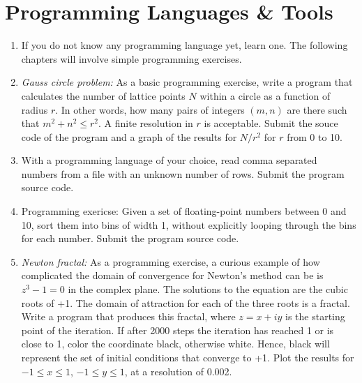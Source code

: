 \documentclass{article}
\begin{document}
\newpage
\section{Programming Languages \& Tools}

\begin{enumerate}

\item If you do not know any programming language yet, learn one. The following chapters will involve simple programming exercises. 

  
\item {\it Gauss circle problem:}
  As a basic programming exercise, write a program that calculates the number of lattice points $N$ within a circle as a function of radius $r$.
In other words, how many pairs of integers $(m,n)$ are there such that $m^2+n^2 \leq  r^2$.
A finite resolution in $r$ is acceptable. Submit the souce code of the program and a graph of the results for $N/r^2$ for $r$ from 0 to 10.

\item 
With a programming language of your choice, read comma separated numbers from a file with an unknown number of rows.
Submit the program source code.


\item
Programming exericse: Given a set of floating-point numbers between 0 and 10, sort them into bins of width 1, without explicitly looping through the bins for each number. Submit the program source code.


\item {\it Newton fractal:}  \label{exrc:fractal}
As a programming exercise, a curious example of how complicated the domain of convergence for Newton's method can be is $z^3-1=0$ in the complex plane.  The solutions to the equation are the cubic roots of +1.  The domain of attraction for each of the three roots is a fractal. Write a program that produces this fractal, where $z=x+iy$ is the starting point of the iteration. If after 2000 steps the iteration has reached 1 or is close to 1, color the coordinate black, otherwise white. Hence, black will represent the set of initial conditions that converge to +1. Plot the results for $-1\leq x \leq 1$, $-1\leq y \leq1$, at a resolution of 0.002.


\end{enumerate}



\newpage
\end{document}
